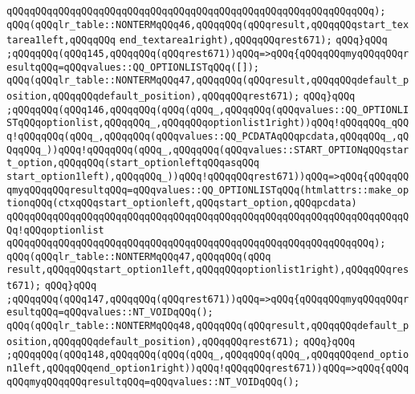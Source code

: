 \verb|qQQqqQQqqQQqqQQqqQQqqQQqqQQqqQQqqQQqqQQqqQQqqQQqqQQqqQQqqQQqqQQq);|\newline
\verb|qQQq(qQQqlr_table::NONTERMqQQq46,qQQqqQQq(qQQqresult,qQQqqQQqstart_textarea1left,qQQqqQQq|\newline
\verb|end_textarea1right),qQQqqQQqrest671);|\newline
\verb|qQQq}qQQq|\newline
\verb|;qQQqqQQq(qQQq145,qQQqqQQq(qQQqrest671))qQQq=>qQQq{qQQqqQQqmyqQQqqQQqresultqQQq=qQQqvalues::QQ_OPTIONLISTqQQq([]);|\newline
\verb|qQQq(qQQqlr_table::NONTERMqQQq47,qQQqqQQq(qQQqresult,qQQqqQQqdefault_position,qQQqqQQqdefault_position),qQQqqQQqrest671);|\newline
\verb|qQQq}qQQq|\newline
\verb|;qQQqqQQq(qQQq146,qQQqqQQq(qQQq(qQQq_,qQQqqQQq(qQQqvalues::QQ_OPTIONLISTqQQqoptionlist,qQQqqQQq_,qQQqqQQqoptionlist1right))qQQq!qQQqqQQq_qQQq!qQQqqQQq(qQQq_,qQQqqQQq(qQQqvalues::QQ_PCDATAqQQqpcdata,qQQqqQQq_,qQQqqQQq_))qQQq!qQQqqQQq(qQQq_,qQQqqQQq(qQQqvalues::START_OPTIONqQQqstart_option,qQQqqQQq(start_optionleftqQQqasqQQq|\newline
\verb|start_option1left),qQQqqQQq_))qQQq!qQQqqQQqrest671))qQQq=>qQQq{qQQqqQQqmyqQQqqQQqresultqQQq=qQQqvalues::QQ_OPTIONLISTqQQq(htmlattrs::make_optionqQQq(ctxqQQqstart_optionleft,qQQqstart_option,qQQqpcdata)|\newline
\verb|qQQqqQQqqQQqqQQqqQQqqQQqqQQqqQQqqQQqqQQqqQQqqQQqqQQqqQQqqQQqqQQqqQQqqQQq!qQQqoptionlist|\newline
\verb|qQQqqQQqqQQqqQQqqQQqqQQqqQQqqQQqqQQqqQQqqQQqqQQqqQQqqQQqqQQqqQQq);|\newline
\verb|qQQq(qQQqlr_table::NONTERMqQQq47,qQQqqQQq(qQQq|\newline
\verb|result,qQQqqQQqstart_option1left,qQQqqQQqoptionlist1right),qQQqqQQqrest671);|\newline
\verb|qQQq}qQQq|\newline
\verb|;qQQqqQQq(qQQq147,qQQqqQQq(qQQqrest671))qQQq=>qQQq{qQQqqQQqmyqQQqqQQqresultqQQq=qQQqvalues::NT_VOIDqQQq();|\newline
\verb|qQQq(qQQqlr_table::NONTERMqQQq48,qQQqqQQq(qQQqresult,qQQqqQQqdefault_position,qQQqqQQqdefault_position),qQQqqQQqrest671);|\newline
\verb|qQQq}qQQq|\newline
\verb|;qQQqqQQq(qQQq148,qQQqqQQq(qQQq(qQQq_,qQQqqQQq(qQQq_,qQQqqQQqend_option1left,qQQqqQQqend_option1right))qQQq!qQQqqQQqrest671))qQQq=>qQQq{qQQqqQQqmyqQQqqQQqresultqQQq=qQQqvalues::NT_VOIDqQQq();|\newline
